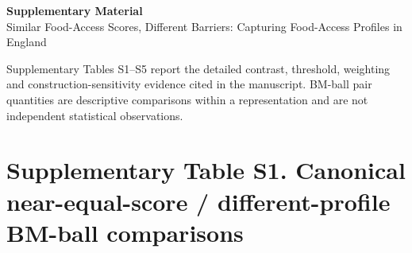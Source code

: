 \documentclass[10pt,a4paper]{article}
\begin{document}
\begin{center}
{\Large\bfseries Supplementary Material}\\[4pt]
{\large Similar Food-Access Scores, Different Barriers: Capturing Food-Access Profiles in England}
\end{center}
\vspace{6pt}
Supplementary Tables S1--S5 report the detailed contrast, threshold, weighting and construction-sensitivity evidence cited in the manuscript. BM-ball pair quantities are descriptive comparisons within a representation and are not independent statistical observations.
\section*{Supplementary Table S1. Canonical near-equal-score / different-profile BM-ball comparisons}
\scriptsize
\end{document}
